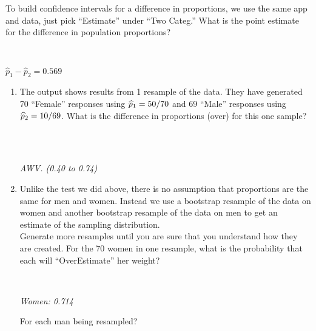 \begin{enumerate}
   To build confidence intervals for a difference in proportions, we
   use the same app and data, just pick ``Estimate'' under ``Two Categ.''
    \label{phatDiff} What is the point estimate for the
       difference in population    proportions? 
\begin{students}
 \ \   \vspace*{1cm}\\
\end{students}
\begin{key}
   $\widehat{p}_1  - \widehat{p}_2 =    0.569$
\end{key}
    \begin{enumerate}
      \item The output shows results from 1 resample of the data.
       They have generated  70 ``Female'' responses using $\widehat{p}_1 =
       50/70$ and 69 ``Male'' responses using $\widehat{p}_2 = 10/69$. What
       is the difference in proportions (over) for this one sample?
\begin{students}
 \ \   \vspace*{1cm}\\
\end{students}
\begin{key}
   \\ {\it AWV. (0.40 to 0.74) }  
\end{key}
       \item  Unlike the test we did above, there is no assumption
         that proportions are the same for men and women.  Instead we
         use a bootstrap resample of the data on women and another bootstrap
         resample of the data on men to get an estimate of the
         sampling distribution. 
            \\  Generate more resamples until you are sure that you
            understand how they are created. For the 70 women in one
            resample, what is the probability that each will 
            ``OverEstimate'' her weight? 
\begin{students}
 \ \   \vspace*{1cm}\\
\end{students}
\begin{key}
  {\it Women: 0.714}\\
\end{key}  For each man being resampled? 
\begin{students}
 \ \   \vspace*{1cm}\\
\end{students}

\end{enumerate}
\end{enumerate}
